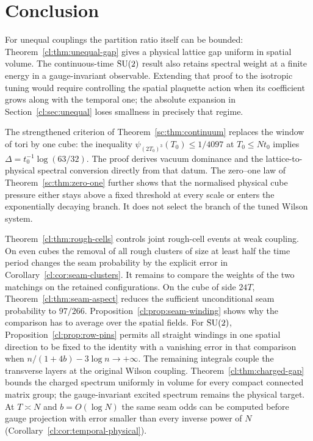\section{Conclusion}\label{sec:conclusion}

For unequal couplings the partition ratio itself can be bounded:
Theorem~\ref{cl:thm:unequal-gap} gives a physical lattice gap uniform
in spatial volume. The continuous-time $\mathrm{SU}(2)$ result also retains
spectral weight at a finite energy in a gauge-invariant observable.
Extending that proof to the isotropic tuning would require controlling
the spatial plaquette action when its coefficient grows along with the
temporal one; the absolute expansion in Section~\ref{cl:sec:unequal}
loses smallness in precisely that regime.

The strengthened criterion of Theorem~\ref{sc:thm:continuum} replaces the
window of tori by one cube: the inequality
$\psi_{(2T_0)^3}(T_0)\le1/4097$ at $T_0\le Nt_0$ implies
$\Delta=t_0^{-1}\log(63/32)$. The proof derives vacuum dominance and the
lattice-to-physical spectral conversion directly from that datum. The
zero--one law of Theorem~\ref{sc:thm:zero-one} further shows that the
normalised physical cube pressure either stays above a fixed threshold
at every scale or enters the exponentially decaying branch. It does not
select the branch of the tuned Wilson system.

Theorem~\ref{cl:thm:rough-cells} controls joint rough-cell events at weak
coupling. On even cubes the removal of all rough clusters of size at
least half the time period changes the seam probability by the explicit
error in Corollary~\ref{cl:cor:seam-clusters}. It remains to compare the
weights of the two matchings on the retained configurations. On the cube
of side $24T$, Theorem~\ref{cl:thm:seam-aspect} reduces the sufficient
unconditional seam probability to $97/266$. Proposition~\ref{cl:prop:seam-winding}
shows why the comparison has to average over the spatial fields.
For $\mathrm{SU}(2)$, Proposition~\ref{cl:prop:row-pins} permits all straight
windings in one spatial direction to be fixed to the identity with a
vanishing error in that comparison when $n/(1+4b)-3\log n\to+\infty$.
The remaining integrals couple the transverse layers at the original
Wilson coupling. Theorem~\ref{cl:thm:charged-gap} bounds the charged
spectrum uniformly in volume for every compact connected matrix group;
the gauge-invariant excited spectrum remains the physical target.
At $T\asymp N$ and $b=O(\log N)$ the same seam odds can be computed
before gauge projection with error smaller than every inverse power of
$N$ (Corollary~\ref{cl:cor:temporal-physical}).

